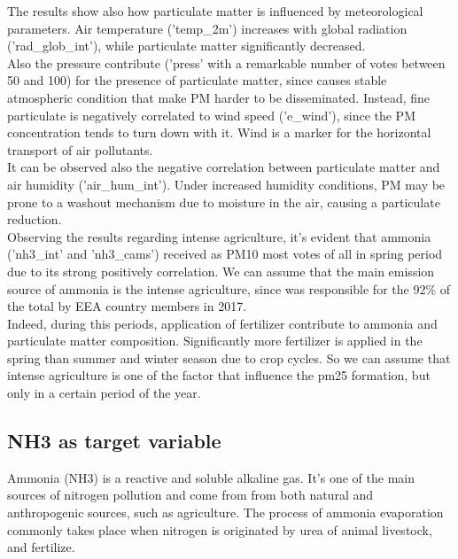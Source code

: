The results show also how particulate matter is influenced by meteorological parameters.
Air temperature ('temp\_2m') increases with global radiation ('rad\_glob\_int'), while particulate matter significantly decreased\cite{li2015particulate}. \\
Also the pressure contribute ('press' with a remarkable number of votes between 50 and 100) for the presence of particulate matter, since causes stable atmospheric condition that make PM harder to be disseminated. 
Instead, fine particulate is negatively correlated to wind speed ('e\_wind'), since the PM concentration tends to turn down with it. Wind is a marker for the horizontal transport of air pollutants.\\
It can be observed also the negative correlation between particulate matter and air humidity ('air\_hum\_int').
Under increased humidity conditions, PM may be prone to a washout mechanism due to moisture in the air, causing a particulate reduction\cite{biglari2017relationship}.\\
Observing the results regarding intense agriculture, it's evident that ammonia ('nh3\_int' and 'nh3\_cams') received as PM10 most votes of all in spring period due to its strong positively correlation. 
We can assume that the main emission source of ammonia is the intense agriculture, since was responsible for the 92\% of the total by EEA country members in 2017\cite{maranzano2022air}.\\
Indeed, during this periods, application of fertilizer contribute to ammonia and particulate matter composition.
Significantly more fertilizer is applied in the spring than summer and winter season due to crop cycles\cite{goebes2003ammonia}.
So we can assume that intense agriculture is one of the factor that influence the pm25 formation, but only in a certain period of the year.\\
\subsection{NH3 as target variable}
Ammonia (NH3) is a reactive and soluble alkaline gas. It's one of the main sources of nitrogen pollution and come from from both natural and anthropogenic sources, such as agriculture.
The process of ammonia evaporation commonly takes place when nitrogen is originated by urea of animal livestock, and fertilize. \\

